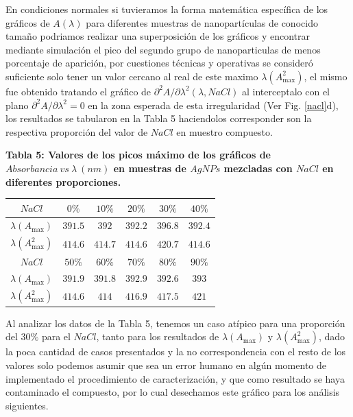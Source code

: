 En condiciones normales si tuvieramos la forma matemática específica de los gráficos de $A(\lambda)$ para diferentes muestras de nanopartículas de conocido tamaño podriamos realizar una superposición de los gráficos y encontrar mediante simulación el pico del segundo grupo de nanoparticulas de menos porcentaje de aparición, por cuestiones técnicas y operativas se consideró suficiente solo tener un valor cercano al real de este maximo $\lambda(A_{\max}^2)$, el mismo fue obtenido tratando el gráfico de $\partial^2 A/\partial \lambda^2 (\lambda,NaCl)$ al interceptalo con el plano $\partial^2 A/\partial \lambda^2=0$ en la zona esperada de esta irregularidad (Ver Fig. \ref{nacl}d), los resultados se tabularon en la Tabla 5 haciendolos corresponder son la respectiva proporción del valor de $NaCl$ en muestro compuesto.

\textbf{Tabla 5: Valores de los picos máximo de los gráficos de $Absorbancia~vs~\lambda~(nm)$ en muestras de $AgNPs$ mezcladas con $NaCl$ en diferentes proporciones.}

\begin{tabular}{|c|c|c|c|c|c|}
    \hline
    $NaCl$ &  $0\%$ & $10\%$ & $20\%$ & $30\%$ & $40\%$ \\
    \hline
    $\lambda(A_{\max})$ & $391.5$ & $392$ & $392.2$ & $396.8$ & $392.4$\\
    \hline
    $\lambda(A_{\max}^2)$ & $414.6$ & $414.7$ & $414.6$ & $420.7$ & $414.6$\\
    \hline\hline
    $NaCl$  & $50\%$ & $60\%$ & $70\%$ & $80\%$ & $90\%$ \\
    \hline
    $\lambda(A_{\max})$ & $391.9$ & $391.8$ & $392.9$ & $392.6$ & $393$\\
    \hline
    $\lambda(A_{\max}^2)$ & $414.6$ & $414$ & $416.9$ & $417.5$ & $421$\\
    \hline
\end{tabular}

Al analizar los datos de la Tabla 5, tenemos un caso atípico para una proporción del $30\%$ para el $NaCl$, tanto para los resultados de $\lambda (A_{\max})$ y $\lambda (A_{\max}^2)$, dado la poca cantidad de casos presentados y la no correspondencia con el resto de los valores solo podemos asumir que sea un error humano en algún momento de implementado el procedimiento de caracterización, y que como resultado se haya contaminado el compuesto, por lo cual desechamos este gráfico para los análisis siguientes.

